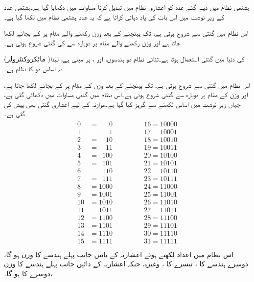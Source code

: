 	 ہشتمی نظام میں دیے گئے عدد کو اعشاری نظام میں تبدیل کرنا مساوات  میں دکھایا گیا ہے۔ہشتمی عدد کے زیر نوشت میں  اس بات کی یاد دہانی کراتا ہے کہ یہ عدد ہشتمی نظام میں لکھا گیا ہے۔ 
	 
	اس نظام میں گنتی  سے شروع ہوتی ہے،  تک پہنچنے کے بعد  وزن رکھنے والے مقام پر  کے بجائے  لکھا جاتا ہے اور  وزن رکھنے والے مقام پر دوبارہ سے  کی گنتی شروع ہوتی ہے۔

  (مائکروکنٹرولر )کی دنیا میں گنتی استعمال ہوتا ہے۔ثنائی نظام دو ہندسوں،  اور ، پر مبنی ہے، لہٰذا یہ اساس دو کا نظام ہے۔

اس نظام میں گنتی  سے شروع ہوتی ہے،  تک پہنچنے کے بعد  وزن  کے  مقام پر  کے بجائے  لکھا جاتا ہے، اور  وزن  کے  مقام پر دوبارہ  سے  گنتی شروع ہوتی ہے۔اس نظام میں گنتی  مساوات  میں دکھائی گئی ہے، جہاں زیر نوشت میں اساس لکھنے سے گریز کیا گیا ہے۔موازنہ کے لیے اعشاری گنتی بھی پیش کی گئی ہے۔
\begin{gather}
\begin{aligned}\label{مساوات_ثنائی_گنتی}
0&=\phantom{000}0 &\quad \quad \quad &16=10000\\
1&=\phantom{000}1 &\quad \quad \quad &17=10001\\
2&=\phantom{00}10 &\quad \quad \quad &18=10010\\
3&=\phantom{00}11 &\quad \quad \quad &19=10011\\
4&=\phantom{0}100 &\quad \quad \quad &20=10100\\
5&=\phantom{0}101 &\quad \quad \quad &21=10101\\
6&=\phantom{0}110 &\quad \quad \quad &22=10110\\
7&=\phantom{0}111 &\quad \quad \quad &23=10111\\
8&=1000 &\quad \quad \quad &24=11000\\
9&=1001 &\quad \quad \quad &25=11001\\
10&=1010 &\quad \quad \quad &26=11010\\
11&=1011 &\quad \quad \quad &27=11011\\
12&=1100 &\quad \quad \quad &28=11100\\
13&=1101 &\quad \quad \quad &29=11101\\
14&=1110 &\quad \quad \quad &30=11110\\
15&=1111 &\quad \quad \quad &31=11111\\
\end{aligned}
\end{gather}
	اس نظام میں اعداد لکھتے ہوئے اعشاریہ کے بائیں جانب پہلے ہندسے کا وزن  ہو گا، دوسرے ہندسے کا  ، تیسرے کا ، وغیرہ، جبکہ اعشاریہ کے دائیں جانب پہلے ہندسے کا وزن  ،دوسرے کا  ہو گا۔
	
